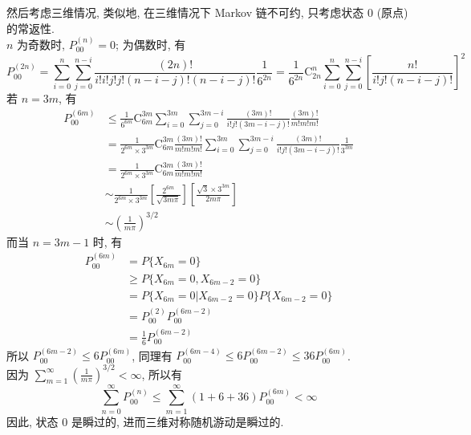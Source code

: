 \documentclass[boxes]{homework}
\begin{document}
\begin{solution}
    然后考虑三维情况, 类似地, 在三维情况下 Markov 链不可约, 只考虑状态 0 (原点) 的常返性.\\
    $n$ 为奇数时, $P_{00}^{(n)} = 0$; 为偶数时, 有
    \begin{equation}
        P_{00}^{(2n)}
        = \sum_{i = 0}^n\sum_{j = 0}^{n - i}
        \frac{(2n)!}{i! i! j! j! (n - i - j)! (n - i - j)!}\frac{1}{6^{2n}}
        = \frac{1}{6^{2n}}\mathrm{C}_{2n}^n \sum_{i = 0}^n\sum_{j = 0}^{n - i}
        \left[\frac{n!}{i! j! (n - i - j)!}\right]^2
    \end{equation}
    若 $n = 3m$, 有
    \begin{equation}
        \begin{aligned}
            P_{00}^{(6m)}
             & \le \frac{1}{6^{6m}}\mathrm{C}_{6m}^{3m} \sum_{i = 0}^{3m}\sum_{j = 0}^{3m - i}
            \frac{(3m)!}{i! j! (3m - i - j)!}\frac{(3m)!}{m!m!m!}                                   \\
             & = \frac{1}{2^{6m}\times 3^{3m}}\mathrm{C}_{6m}^{3m}\frac{(3m)!}{m!m!m!}
            \sum_{i = 0}^{3m}\sum_{j = 0}^{3m - i}\frac{(3m)!}{i! j! (3m - i - j)!}\frac{1}{3^{3m}} \\
             & = \frac{1}{2^{6m}\times 3^{3m}}\mathrm{C}_{6m}^{3m}\frac{(3m)!}{m!m!m!}              \\
             & \sim \frac{1}{2^{6m}\times 3^{3m}} \left[\frac{2^{6m}}{\sqrt{3m\pi}}\right]
            \left[\frac{\sqrt{3}\times 3^{3m}}{2m\pi}\right]                                        \\
             & \sim \left(\frac{1}{m\pi}\right)^{3/2}
        \end{aligned}
    \end{equation}
    而当 $n = 3m - 1$ 时, 有
    \begin{equation}
        \begin{aligned}
            P_{00}^{(6m)}
             & = P\{X_{6m} = 0\}                                          \\
             & \ge P\{X_{6m} = 0, X_{6m - 2} = 0\}                        \\
             & = P\{X_{6m} = 0 \vert X_{6m - 2} = 0\} P\{X_{6m - 2} = 0\} \\
             & = P_{00}^{(2)} P_{00}^{(6m - 2)}                           \\
             & = \frac{1}{6} P_{00}^{(6m - 2)}
        \end{aligned}
    \end{equation}
    所以 $P_{00}^{(6m - 2)} \le 6 P_{00}^{(6m)}$, 同理有 $P_{00}^{(6m - 4)} \le 6 P_{00}^{(6m -2)} \le
        36 P_{00}^{(6m)}$.\\
    因为 $\sum_{m = 1}^\infty \left(\frac{1}{m\pi}\right)^{3/2} < \infty$, 所以有
    \begin{equation}
        \sum_{n = 0}^\infty P_{00}^{(n)} \le \sum_{m = 1}^\infty (1 + 6 + 36)P_{00}^{(6m)} < \infty
    \end{equation}
    因此, 状态 0 是瞬过的, 进而三维对称随机游动是瞬过的.
\end{solution}
\end{document}
